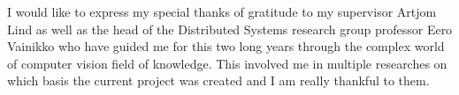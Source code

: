 \documentclass[../main.tex]{subfiles}
\begin{document}
I would like to express my special thanks of gratitude to my supervisor Artjom Lind as well as the head of the Distributed Systems research group professor Eero Vainikko who have guided me for this two long years through the complex world of computer vision field of knowledge. This involved me in multiple researches on which basis the current project was created and I am really thankful to them.
\end{document}
